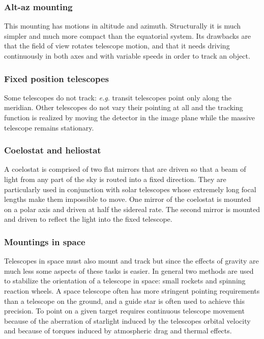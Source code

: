 \subsubsection{Alt-az mounting}
This mounting has motions in altitude and azimuth. Structurally 
it is much simpler and much more compact than the equatorial system. Its drawbacks are 
that the field of view
rotates telescope motion, and that it needs driving continuously in both axes and with 
variable speeds in order to track an object. 

\subsubsection{Fixed position telescopes}
Some telescopes do not track: {\it e.g.} transit telescopes
point only along the meridian. Other telescopes do not vary their pointing at all and
the tracking function is realized by moving the detector in the image plane while the 
massive telescope remains stationary.

\subsubsection{Coelostat and heliostat}
A coelostat is comprised of two flat mirrors that are driven 
so that a beam of light from any part of the sky is routed into a fixed direction. They are
particularly used in conjunction with solar telescopes whose extremely long focal lengths
make them impossible to move. One mirror of the coelostat is mounted on a polar axis and
driven at half the sidereal rate. The second mirror is mounted and driven to reflect the light
into the fixed telescope.

\subsubsection{Mountings in space}
Telescopes in space must also mount and track but since the 
effects of gravity are much less some aspects of these tasks is easier. In general two methods
are used to stabilize the orientation of a telescope in space: small rockets and spinning 
reaction wheels. A space telescope often has more stringent pointing requirements than
a telescope on the ground, and a guide star is often used to achieve this precision. To point
on a given target requires continuous telescope movement because of the aberration of 
starlight induced by the telescopes orbital velocity and because of torques induced by 
atmospheric drag and thermal effects. 

